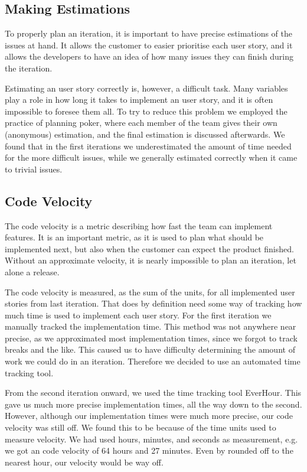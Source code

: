 \subsection{Making Estimations}
To properly plan an iteration, it is important to have precise estimations of the issues at hand.
It allows the customer to easier prioritise each user story, and it allows the developers to have an idea of how many issues they can finish during the iteration.

Estimating an user story correctly is, however, a difficult task.
Many variables play a role in how long it takes to implement an user story, and it is often impossible to foresee them all.
To try to reduce this problem we employed the practice of planning poker, where each member of the team gives their own (anonymous) estimation, and the final estimation is discussed afterwards.
We found that in the first iterations we underestimated the amount of time needed for the more difficult issues, while we generally estimated correctly when it came to trivial issues.

\subsection{Code Velocity}
The code velocity is a metric describing how fast the team can implement features.
It is an important metric, as it is used to plan what should be implemented next, but also when the customer can expect the product finished.
Without an approximate velocity, it is nearly impossible to plan an iteration, let alone a release.

The code velocity is measured, as the sum of the units, for all implemented user stories from last iteration.
That does by definition need some way of tracking how much time is used to implement each user story.
For the first iteration we manually tracked the implementation time. This method was not anywhere near precise, as we approximated most implementation times, since we forgot to track breaks and the like. This caused us to have difficulty determining the amount of work we could do in an iteration. Therefore we decided to use an automated time tracking tool.

From the second iteration onward, we used the time tracking tool EverHour. 
This gave us much more precise implementation times, all the way down to the second.
However, although our implementation times were much more precise, our code velocity was still off.
We found this to be because of the time units used to measure velocity.
We had used hours, minutes, and seconds as measurement, e.g. we got an code velocity of 64 hours and 27 minutes.
Even by rounded off to the nearest hour, our velocity would be way off.

